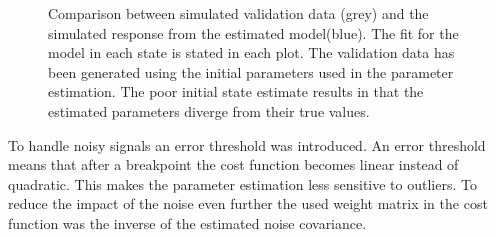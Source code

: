 \begin{figure}[tbp]
  \centering %
  \qquad
  \qquad
    \qquad
    \qquad
    \qquad
  \caption{\label{fig:angVelSim}%
    Comparison between simulated validation data (grey) and the simulated response from the estimated model(blue). The fit for the model in each state is stated in each plot. The validation data has been generated using the initial parameters used in the parameter estimation. The poor initial state estimate results in that the estimated parameters diverge from their true values.}
\end{figure}

To handle noisy signals an error threshold was introduced. An error threshold means that after a breakpoint the cost function becomes linear instead of quadratic. This makes the parameter estimation less sensitive to outliers. To reduce the impact of the noise even further the used weight matrix in the cost function was the inverse of the estimated noise covariance. 

